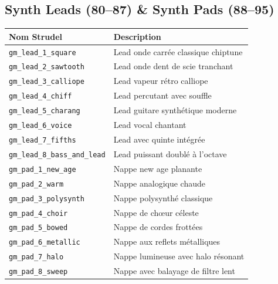\documentclass[a4paper,10pt]{article}
\begin{document}
\subsection{Synth Leads (80--87) \& Synth Pads (88--95)}
\begin{tabularx}{\linewidth}{|l|X|}
\hline
\textbf{Nom Strudel} & \textbf{Description} \\
\hline
\texttt{gm\_lead\_1\_square} & Lead onde carrée classique chiptune \\
\texttt{gm\_lead\_2\_sawtooth} & Lead onde dent de scie tranchant \\
\texttt{gm\_lead\_3\_calliope} & Lead vapeur rétro calliope \\
\texttt{gm\_lead\_4\_chiff} & Lead percutant avec souffle \\
\texttt{gm\_lead\_5\_charang} & Lead guitare synthétique moderne \\
\texttt{gm\_lead\_6\_voice} & Lead vocal chantant \\
\texttt{gm\_lead\_7\_fifths} & Lead avec quinte intégrée \\
\texttt{gm\_lead\_8\_bass\_and\_lead} & Lead puissant doublé à l'octave \\
\texttt{gm\_pad\_1\_new\_age} & Nappe new age planante \\
\texttt{gm\_pad\_2\_warm} & Nappe analogique chaude \\
\texttt{gm\_pad\_3\_polysynth} & Nappe polysynthé classique \\
\texttt{gm\_pad\_4\_choir} & Nappe de chœur céleste \\
\texttt{gm\_pad\_5\_bowed} & Nappe de cordes frottées \\
\texttt{gm\_pad\_6\_metallic} & Nappe aux reflets métalliques \\
\texttt{gm\_pad\_7\_halo} & Nappe lumineuse avec halo résonant \\
\texttt{gm\_pad\_8\_sweep} & Nappe avec balayage de filtre lent \\
\hline
\end{tabularx}
\end{document}
